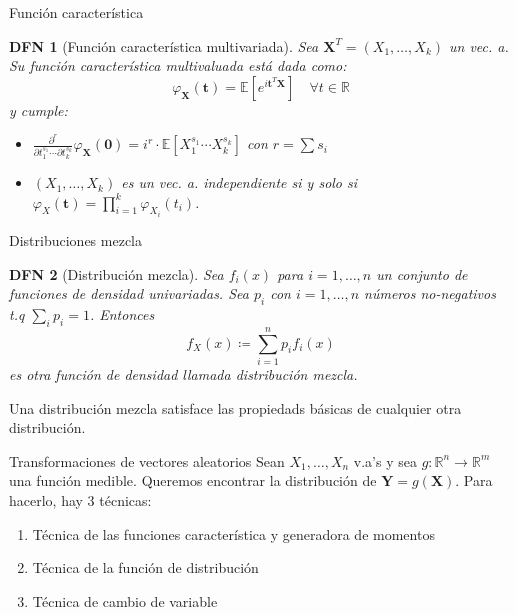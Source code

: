 \documentclass[a4paper]{article}
\newtheorem{definition}{DFN}
\theoremstyle{mytheoremstyle}
\newcommand{\R}{\mathbb{R}}
\newcommand{\E}{\mathbb{E}}
\newcommand{\1}{\mathds{1}}
\renewcommand{\vec}[1]{\boldsymbol{#1}}
\begin{document}
\begin{multicols*}{3}
\begin{roundbox}{Función característica}
\begin{definition}[Función característica multivariada]
    Sea $\vec{X}^{T} = (X_1, \dots , X_k)$ un vec. a.
    Su función característica multivaluada está dada como:
    \begin{equation*}
        \varphi_{\vec{X}} (\vec{t}) = \E\left[ e^{i \vec{t}^{T} \vec{X}} \right] \quad \forall t \in \R
    \end{equation*}
    y cumple:
    \begin{itemize}
        \item $\displaystyle \frac{\partial^{r}}{\partial t_{1}^{s_1} \cdots \partial t_{k}^{s_k}} \varphi_{\vec{X}} (\vec{0}) = i^{r} \cdot \E \left[ X_{1}^{s_1} \cdots X_{k}^{s_k} \right]$ con $r = \sum s_i$
        \item $(X_1, \dots , X_k)$ es un vec. a. independiente si y solo si $\varphi_{X} (\vec{t}) = \prod_{i=1}^{k} \varphi_{X_i} (t_i)$.
    \end{itemize}
\end{definition}
\end{roundbox}

\begin{roundbox}{Distribuciones mezcla}
\begin{definition}[Distribución mezcla]
    Sea $f_i (x)$ para $i=1, \dots , n$ un conjunto de funciones de densidad univariadas.
    Sea $p_i$ con $i=1, \dots , n$ números no-negativos t.q $\sum_{i} p_i = 1$.
    Entonces
    \begin{equation*}
        f_X (x) \coloneqq \sum_{i=1}^{n} p_i f_i (x)
    \end{equation*}
    es otra función de densidad llamada distribución mezcla.
\end{definition}

Una distribución mezcla satisface las propiedads básicas de cualquier otra distribución.
\end{roundbox}

\pagebreak

\begin{roundbox}{Transformaciones de vectores aleatorios}
Sean $X_1, \dots, X_n$ v.a's y sea $g: \R^{n} \to \R^{m}$ una función medible.
Queremos encontrar la distribución de $\vec{Y} = g(\vec{X})$.
Para hacerlo, hay 3 técnicas:
\begin{enumerate}
    \item Técnica de las funciones característica y generadora de momentos
    \item Técnica de la función de distribución
    \item Técnica de cambio de variable
\end{enumerate}


\end{roundbox}
\end{multicols*}
\end{document}
